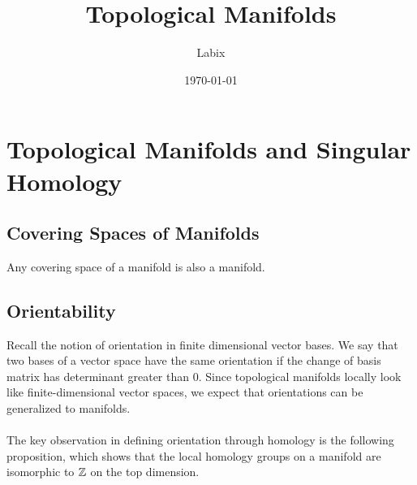 \documentclass[a4paper]{article}
\title{Topological Manifolds}
\author{Labix}
\date{\today}
\begin{document}
\maketitle
\begin{abstract}
\end{abstract}
\pagebreak
\tableofcontents
\pagebreak

\section{Topological Manifolds and Singular Homology}
\subsection{Covering Spaces of Manifolds}
\begin{prp}{}{} Any covering space of a manifold is also a manifold. 
\end{prp}

\subsection{Orientability}
Recall the notion of orientation in finite dimensional vector bases. We say that two bases of a vector space have the same orientation if the change of basis matrix has determinant greater than $0$. Since topological manifolds locally look like finite-dimensional vector spaces, we expect that orientations can be generalized to manifolds. \\~\\

The key observation in defining orientation through homology is the following proposition, which shows that the local homology groups on a manifold are isomorphic to $\mathbb{Z}$ on the top dimension. 
\end{document}
